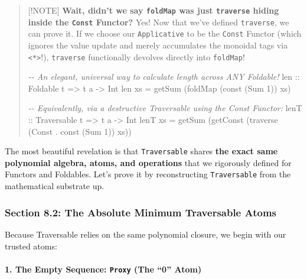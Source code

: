 \documentclass[
]{article}
\newenvironment{Shaded}{}{}
\newcommand{\CommentTok}[1]{\textcolor[rgb]{0.38,0.63,0.69}{\textit{#1}}}
\newcommand{\DataTypeTok}[1]{\textcolor[rgb]{0.56,0.13,0.00}{#1}}
\newcommand{\DecValTok}[1]{\textcolor[rgb]{0.25,0.63,0.44}{#1}}
\newcommand{\FunctionTok}[1]{\textcolor[rgb]{0.02,0.16,0.49}{#1}}
\newcommand{\NormalTok}[1]{#1}
\newcommand{\OperatorTok}[1]{\textcolor[rgb]{0.40,0.40,0.40}{#1}}
\newcommand{\OtherTok}[1]{\textcolor[rgb]{0.00,0.44,0.13}{#1}}
\begin{document}
\begin{quote}
{[}!NOTE{]} \textbf{Wait, didn't we say \texttt{foldMap} was just
\texttt{traverse} hiding inside the \texttt{Const} Functor?} Yes! Now
that we've defined \texttt{traverse}, we can prove it. If we choose our
\texttt{Applicative} to be the \texttt{Const} Functor (which ignores the
value update and merely accumulates the monoidal tags via
\texttt{\textless{}*\textgreater{}}!), \texttt{traverse} functionally
devolves directly into \texttt{foldMap}!

\begin{Shaded}
\begin{Highlighting}[]
\CommentTok{{-}{-} An elegant, universal way to calculate length across ANY Foldable!}
\OtherTok{len ::} \DataTypeTok{Foldable}\NormalTok{ t }\OtherTok{=\textgreater{}}\NormalTok{ t a }\OtherTok{{-}\textgreater{}} \DataTypeTok{Int}
\NormalTok{len xs }\OtherTok{=}\NormalTok{ getSum (}\FunctionTok{foldMap}\NormalTok{ (}\FunctionTok{const}\NormalTok{ (}\DataTypeTok{Sum} \DecValTok{1}\NormalTok{)) xs)}

\CommentTok{{-}{-} Equivalently, via a destructive Traversable using the \textasciigrave{}Const\textasciigrave{} Functor:}
\OtherTok{lenT ::} \DataTypeTok{Traversable}\NormalTok{ t }\OtherTok{=\textgreater{}}\NormalTok{ t a }\OtherTok{{-}\textgreater{}} \DataTypeTok{Int}
\NormalTok{lenT xs }\OtherTok{=}\NormalTok{ getSum (getConst (}\FunctionTok{traverse}\NormalTok{ (}\DataTypeTok{Const} \OperatorTok{.} \FunctionTok{const}\NormalTok{ (}\DataTypeTok{Sum} \DecValTok{1}\NormalTok{)) xs))}
\end{Highlighting}
\end{Shaded}
\end{quote}

The most beautiful revelation is that \texttt{Traversable} shares
\textbf{the exact same polynomial algebra, atoms, and operations} that
we rigorously defined for Functors and Foldables. Let's prove it by
reconstructing \texttt{Traversable} from the mathematical substrate up.

\subsubsection{Section 8.2: The Absolute Minimum Traversable
Atoms}\label{section-8.2-the-absolute-minimum-traversable-atoms}

Because Traversable relies on the same polynomial closure, we begin with
our trusted atoms:

\paragraph{\texorpdfstring{1. The Empty Sequence: \texttt{Proxy} (The
``0''
Atom)}{1. The Empty Sequence: Proxy (The ``0'' Atom)}}\label{the-empty-sequence-proxy-the-0-atom}
\end{document}
